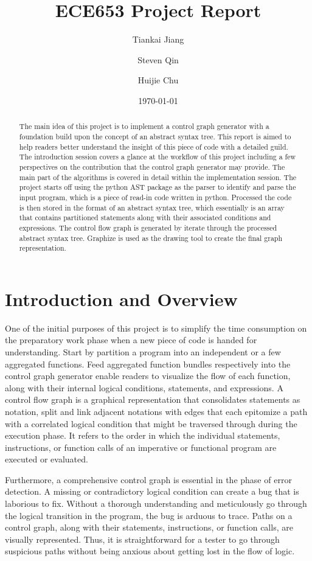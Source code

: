 \documentclass[11pt]{article}
\title{ECE653 Project Report}
\author{Tiankai Jiang \and Steven Qin \and Huijie Chu}
\date{\today}
\begin{document}
\maketitle

\begin{abstract}
The main idea of this project is to implement a control graph generator with a foundation build upon the concept of an abstract syntax tree. This report is aimed to help readers better understand the insight of this piece of code with a detailed guild. The introduction session covers a glance at the workflow of this project including a few perspectives on the contribution that the control graph generator may provide. The main part of the algorithms is covered in detail within the implementation session. The project starts off using the python AST package as the parser to identify and parse the input program, which is a piece of read-in code written in python. Processed the code is then stored in the format of an abstract syntax tree, which essentially is an array that contains partitioned statements along with their associated conditions and expressions. The control flow graph is generated by iterate through the processed abstract syntax tree. Graphize is used as the drawing tool to create the final graph representation.
\end{abstract}

\section{Introduction and Overview}\label{section-introduction}
One of the initial purposes of this project is to simplify the time consumption on the preparatory work phase when a new piece of code is handed for understanding. Start by partition a program into an independent or a few aggregated functions. Feed aggregated function bundles respectively into the control graph generator enable readers to visualize the flow of each function, along with their internal logical conditions, statements, and expressions. A control flow graph is a graphical representation that consolidates statements as notation, split and link adjacent notations with edges that each epitomize a path with a correlated logical condition that might be traversed through during the execution phase. It refers to the order in which the individual statements, instructions, or function calls of an imperative or functional program are executed or evaluated.

Furthermore, a comprehensive control graph is essential in the phase of error detection. A missing or contradictory logical condition can create a bug that is laborious to fix. Without a thorough understanding and meticulously go through the logical transition in the program, the bug is arduous to trace. Paths on a control graph, along with their statements, instructions, or function calls, are visually represented. Thus, it is straightforward for a tester to go through suspicious paths without being anxious about getting lost in the flow of logic.
\end{document}
